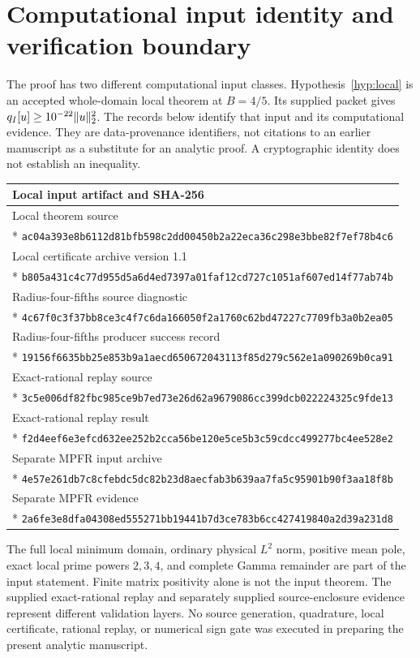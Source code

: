\section{Computational input identity and verification boundary}\label{app:provenance}
The proof has two different computational input classes.
Hypothesis~\ref{hyp:local} is an accepted whole-domain local theorem at $B=4/5$.
Its supplied packet gives $q_I[u]\ge10^{-22}\lVert u\rVert_2^2$.
The records below identify that input and its computational evidence.
They are data-provenance identifiers, not citations to an earlier manuscript as a substitute for an analytic proof.
A cryptographic identity does not establish an inequality.

\begingroup\small
\begin{longtable}{@{}p{}@{}}
\toprule Local input artifact and SHA-256\\\midrule\endhead
Local theorem source\\*
\nolinkurl{ac04a393e8b6112d81bfb598c2dd00450b2a22eca36c298e3bbe82f7ef78b4c6}\\[3pt]
Local certificate archive version 1.1\\*
\nolinkurl{b805a431c4c77d955d5a6d4ed7397a01faf12cd727c1051af607ed14f77ab74b}\\[3pt]
Radius-four-fifths source diagnostic\\*
\nolinkurl{4c67f0c3f37bb8ce3c4f7c6da166050f2a1760c62bd47227c7709fb3a0b2ea05}\\[3pt]
Radius-four-fifths producer success record\\*
\nolinkurl{19156f6635bb25e853b9a1aecd650672043113f85d279c562e1a090269b0ca91}\\[3pt]
Exact-rational replay source\\*
\nolinkurl{3c5e006df82fbc985ce9b7ed73e26d62a9679086cc399dcb022224325c9fde13}\\[3pt]
Exact-rational replay result\\*
\nolinkurl{f2d4eef6e3efcd632ee252b2cca56be120e5ce5b3c59cdcc499277bc4ee528e2}\\[3pt]
Separate MPFR input archive\\*
\nolinkurl{4e57e261db7c8cfebdc5dc82b23d8aecfab3b639aa7fa5c95901b90f3aa18f8b}\\[3pt]
Separate MPFR evidence\\*
\nolinkurl{2a6fe3e8dfa04308ed555271bb19441b7d3ce783b6cc427419840a2d39a231d8}\\
\bottomrule
\end{longtable}\endgroup
The full local minimum domain, ordinary physical $L^2$ norm, positive mean pole, exact local prime powers $2,3,4$, and complete Gamma remainder are part of the input statement.
Finite matrix positivity alone is not the input theorem.
The supplied exact-rational replay and separately supplied source-enclosure evidence represent different validation layers.
No source generation, quadrature, local certificate, rational replay, or numerical sign gate was executed in preparing the present analytic manuscript.

